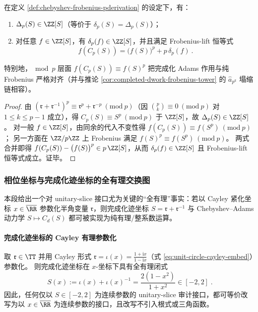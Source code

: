 \begin{proposition}\label{prop:chebyshev-frobenius-pderivation-integrality}
在定义 \ref{def:chebyshev-frobenius-pderivation} 的设定下，有：
\begin{enumerate}
  \item \(\Delta_p(S)\in\ZZ[S]\)（等价于 \(\delta_p(S)=\Delta_p(S)\)）；
  \item 对任意 \(f\in\ZZ[S]\)，有 \(\delta_p(f)\in\ZZ[S]\)，并且满足 Frobenius-lift 恒等式
  \[
  \boxed{\ f(C_p(S))=\bigl(f(S)\bigr)^p+p\,\delta_p(f)\ }.
  \]
\end{enumerate}
特别地，\(\bmod p\) 层面 \(f(C_p(S))\equiv f(S)^p\) 把完成化 Adams 作用与纯 Frobenius 严格对齐（并与推论 \ref{cor:completed-dwork-frobenius-tower} 的 \(\widehat a_{p^k}\) 塌缩链相容）。
\end{proposition}
\begin{proof}
由 \((\mathfrak{r}+\mathfrak{r}^{-1})^p\equiv \mathfrak{r}^p+\mathfrak{r}^{-p}\ (\mathrm{mod}\ p)\)（因 \(\binom{p}{k}\equiv 0\ (\mathrm{mod}\ p)\) 对 \(1\le k\le p-1\) 成立），得
\(
C_p(S)\equiv S^p\ (\mathrm{mod}\ p)
\) 于 \(\ZZ[S]\)，故 \(\Delta_p(S)\in\ZZ[S]\)。
对一般 \(f\in\ZZ[S]\)，由同余的代入不变性得
\(
f(C_p(S))\equiv f(S^p)\ (\mathrm{mod}\ p)
\)；
另一方面在 \(\ZZ/p\ZZ\) 上 Frobenius 满足 \(f(S)^p\equiv f(S^p)\ (\mathrm{mod}\ p)\)。
两式合并即得 \(f(C_p(S))-\bigl(f(S)\bigr)^p\in p\,\ZZ[S]\)，从而 \(\delta_p(f)\in\ZZ[S]\) 且 Frobenius-lift 恒等式成立。证毕。
\end{proof}

\subsubsection{相位坐标与完成化迹坐标的全有理交换图}\label{subsubsec:phase-completion-rational-exchange}
本段给出一个对 unitary-slice 接口尤为关键的“全有理”事实：若以 Cayley 紧化坐标 \(x\in\overline{\RR}\) 参数化半角变量 \(\mathfrak{r}\)，则完成化迹坐标 \(S=\mathfrak{r}+\mathfrak{r}^{-1}\) 与 Chebyshev--Adams 动力学 \(S\mapsto C_d(S)\) 都可被实现为纯有理/整系数运算。

\paragraph{完成化迹坐标的 Cayley 有理参数化}
取 \(\mathfrak{r}\in\TT\) 并用 Cayley 形式 \(\mathfrak{r}=\iota(x)=\frac{1+\mathrm{i}x}{1-\mathrm{i}x}\)（式 \eqref{eq:unit-circle-cayley-embed}）参数化。
则完成化迹坐标在 \(x\)-坐标下具有全有理闭式
\begin{equation}\label{eq:phase-completion-trace-rational}
\boxed{\;
S(x):=\iota(x)+\iota(x)^{-1}
=\frac{2(1-x^2)}{1+x^2}\in[-2,2]\; }.
\end{equation}
因此，任何仅以 \(S\in[-2,2]\) 为连续参数的 unitary-slice 审计接口，都可等价改写为以 \(x\in\overline{\RR}\) 为连续参数的接口，且改写不引入根式或三角函数。

